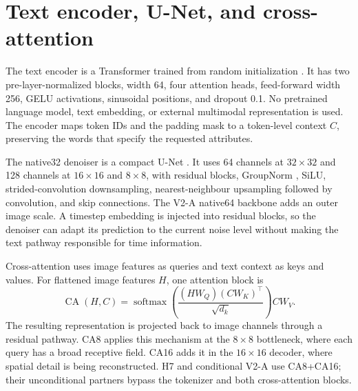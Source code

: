 \section{Text encoder, U-Net, and cross-attention}\label{sec:architecture}
The text encoder is a Transformer trained from random initialization \parencite{vaswani2017attention}. It has two pre-layer-normalized blocks, width 64, four attention heads, feed-forward width 256, GELU activations, sinusoidal positions, and dropout 0.1. No pretrained language model, text embedding, or external multimodal representation is used. The encoder maps token IDs and the padding mask to a token-level context $C$, preserving the words that specify the requested attributes.

The native32 denoiser is a compact U-Net \parencite{ronneberger2015unet}. It uses 64 channels at $32\times32$ and 128 channels at $16\times16$ and $8\times8$, with residual blocks, GroupNorm \parencite{wu2018groupnorm}, SiLU, strided-convolution downsampling, nearest-neighbour upsampling followed by convolution, and skip connections. The V2-A native64 backbone adds an outer image scale. A timestep embedding is injected into residual blocks, so the denoiser can adapt its prediction to the current noise level without making the text pathway responsible for time information.

Cross-attention uses image features as queries and text context as keys and values. For flattened image features $H$, one attention block is
\begin{equation}\label{eq:cross-attention}
\operatorname{CA}(H,C)=\operatorname{softmax}\!\left(\frac{(HW_Q)(CW_K)^\top}{\sqrt{d_k}}\right)CW_V.
\end{equation}
The resulting representation is projected back to image channels through a residual pathway. CA8 applies this mechanism at the $8\times8$ bottleneck, where each query has a broad receptive field. CA16 adds it in the $16\times16$ decoder, where spatial detail is being reconstructed. H7 and conditional V2-A use CA8+CA16; their unconditional partners bypass the tokenizer and both cross-attention blocks.


